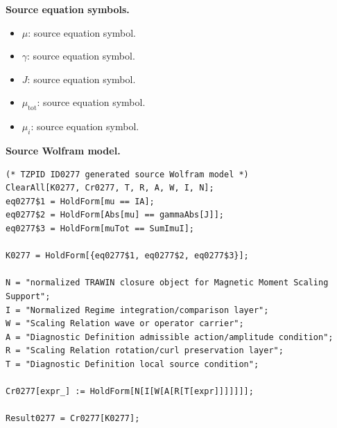 \begin{minipage}[t]{0.49\linewidth}
\begingroup
\small
\raggedright
\textbf{Source equation symbols.}\par
\begin{itemize}[leftmargin=1.35em,itemsep=1pt,topsep=1pt,parsep=0pt]
    \item $\mu$: source equation symbol.
    \item $\gamma$: source equation symbol.
    \item $J$: source equation symbol.
    \item $\mu_{\mathrm{tot}}$: source equation symbol.
    \item $\mu_i$: source equation symbol.
\end{itemize}
\endgroup
\end{minipage}\hfill
\begin{minipage}[t]{0.47\linewidth}
\begingroup
\scriptsize
\raggedright
\textbf{Source Wolfram model.}\par
\begin{Verbatim}[fontsize=\tiny,breaklines=true,breakanywhere=true]
(* TZPID ID0277 generated source Wolfram model *)
ClearAll[K0277, Cr0277, T, R, A, W, I, N];
eq0277$1 = HoldForm[mu == IA];
eq0277$2 = HoldForm[Abs[mu] == gammaAbs[J]];
eq0277$3 = HoldForm[muTot == SumImuI];

K0277 = HoldForm[{eq0277$1, eq0277$2, eq0277$3}];

N = "normalized TRAWIN closure object for Magnetic Moment Scaling Support";
I = "Normalized Regime integration/comparison layer";
W = "Scaling Relation wave or operator carrier";
A = "Diagnostic Definition admissible action/amplitude condition";
R = "Scaling Relation rotation/curl preservation layer";
T = "Diagnostic Definition local source condition";

Cr0277[expr_] := HoldForm[N[I[W[A[R[T[expr]]]]]]];

Result0277 = Cr0277[K0277];
\end{Verbatim}
\endgroup
\end{minipage}

